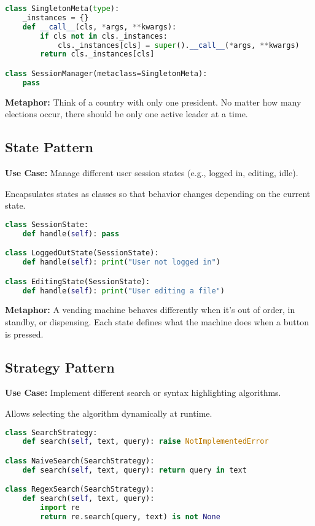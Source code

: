 \documentclass[12pt]{article}
\begin{document}
\begin{lstlisting}[language=Python]
class SingletonMeta(type):
    _instances = {}
    def __call__(cls, *args, **kwargs):
        if cls not in cls._instances:
            cls._instances[cls] = super().__call__(*args, **kwargs)
        return cls._instances[cls]

class SessionManager(metaclass=SingletonMeta):
    pass
\end{lstlisting}

\textbf{Metaphor:} Think of a country with only one president. No matter how many elections occur, there should be only one active leader at a time.

\subsection{State Pattern}
\textbf{Use Case:} Manage different user session states (e.g., logged in, editing, idle).

Encapsulates states as classes so that behavior changes depending on the current state.

\begin{lstlisting}[language=Python]
class SessionState:
    def handle(self): pass

class LoggedOutState(SessionState):
    def handle(self): print("User not logged in")

class EditingState(SessionState):
    def handle(self): print("User editing a file")
\end{lstlisting}

\textbf{Metaphor:} A vending machine behaves differently when it's out of order, in standby, or dispensing. Each state defines what the machine does when a button is pressed.

\subsection{Strategy Pattern}
\textbf{Use Case:} Implement different search or syntax highlighting algorithms.

Allows selecting the algorithm dynamically at runtime.

\begin{lstlisting}[language=Python]
class SearchStrategy:
    def search(self, text, query): raise NotImplementedError

class NaiveSearch(SearchStrategy):
    def search(self, text, query): return query in text

class RegexSearch(SearchStrategy):
    def search(self, text, query):
        import re
        return re.search(query, text) is not None
\end{lstlisting}
\end{document}
